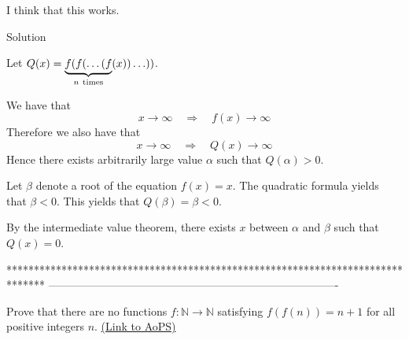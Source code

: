 \begin{mysolution}
	I think that this works.

\begin{bolded}Solution\end{bolded}

Let $Q(x)=\underbrace{f(f(\ldots(f}_{n\ {\rm times}}(x))\ldots))$.

We have that
\[x \rightarrow \infty \quad \Rightarrow \quad f(x) \rightarrow \infty\]
Therefore we also have that
\[x \rightarrow \infty \quad \Rightarrow \quad Q(x) \rightarrow \infty\]
Hence there exists arbitrarily large value $\alpha$ such that $Q(\alpha)>0$.

Let $\beta$ denote a root of the equation $f(x)=x$. The quadratic formula yields that $\beta < 0$. This yields that $Q(\beta)=\beta<0$.

By the intermediate value theorem, there exists $x$ between $\alpha$ and $\beta$ such that $Q(x)=0$.
\end{mysolution}
*******************************************************************************
-------------------------------------------------------------------------------

\begin{problem}
	Prove that there are no functions $f: \mathbb N \to \mathbb N$ satisfying $f(f(n))=n+1$ for all positive integers $n$.
	\flushright \href{https://artofproblemsolving.com/community/c6h173160}{(Link to AoPS)}
\end{problem}




